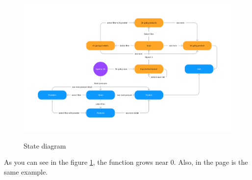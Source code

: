 \documentclass{article}
\begin{document}
	\begin{figure}[h]
		\caption{State diagram}
		\centering
		\includegraphics[width=\textwidth]{state.png}
		\label{fig:state}
	\end{figure}
	As you can see in the figure \ref{fig:state}, the function grows near 0. Also, in the page \pageref{fig:state} is the same example.\pageref{fig:state}
	


	


\end{document}
